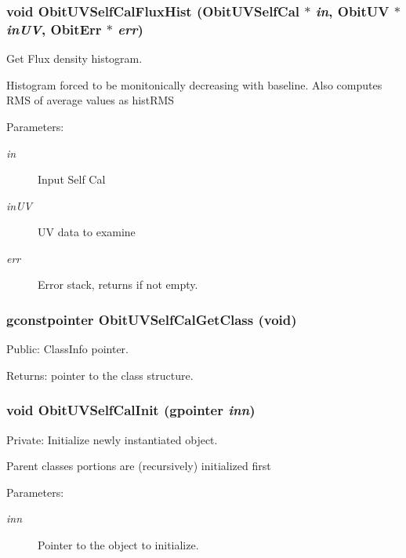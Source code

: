 \subsubsection{\setlength{\rightskip}{0pt plus 5cm}void Obit\-UVSelf\-Cal\-Flux\-Hist ({\bf Obit\-UVSelf\-Cal} $\ast$ {\em in}, {\bf Obit\-UV} $\ast$ {\em in\-UV}, {\bf Obit\-Err} $\ast$ {\em err})}\label{ObitUVSelfCal_8c_a13}


Get Flux density histogram. 

Histogram forced to be monitonically decreasing with baseline. Also computes RMS of average values as hist\-RMS \begin{Desc}
\item[Parameters:]
\begin{description}
\item[{\em in}]Input Self Cal \item[{\em in\-UV}]UV data to examine \item[{\em err}]Error stack, returns if not empty. \end{description}
\end{Desc}
\subsubsection{\setlength{\rightskip}{0pt plus 5cm}gconstpointer Obit\-UVSelf\-Cal\-Get\-Class (void)}\label{ObitUVSelfCal_8c_a7}


Public: Class\-Info pointer. 

\begin{Desc}
\item[Returns:]pointer to the class structure. \end{Desc}
\subsubsection{\setlength{\rightskip}{0pt plus 5cm}void Obit\-UVSelf\-Cal\-Init (gpointer {\em inn})}\label{ObitUVSelfCal_8c_a3}


Private: Initialize newly instantiated object. 

Parent classes portions are (recursively) initialized first \begin{Desc}
\item[Parameters:]
\begin{description}
\item[{\em inn}]Pointer to the object to initialize. \end{description}
\end{Desc}
